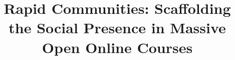 \documentclass[manuscript,screen,review]{acmart}
\begin{document}
\title{Rapid Communities: Scaffolding the Social Presence in Massive Open Online Courses}









\renewcommand{\shortauthors}{Trovato and Tobin, et al.}
\end{document}
